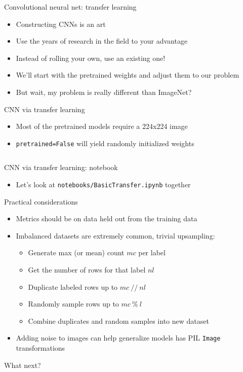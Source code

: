 \documentclass[hyperref={pdfpagelabels=false},12pt]{beamer}
\newcommand{\code}[2]{\texttt{#2}}
\newcommand{\python}[1]{\code{python}{#1}}
\newcommand{\unnamedUrl}[1]{\href{#1}{\color{blue}{#1}}}
\newcommand{\namedUrl}[2]{\href{#1}{\color{blue}{#2}}}
\newcommand{\pygment}[3]{\inputminted[bgcolor=lightgray,linenos,fontsize=#1]{#2}{#3}}
\begin{document}
\begin{frame}{Convolutional neural net: transfer learning}
  \begin{itemize}
    \item Constructing CNNs is an art
    \item Use the years of research in the field to your advantage
    \item Instead of rolling your own, use an existing one!
    \item We'll start with the pretrained weights and adjust them to our problem
    \item But wait, my problem is really different than ImageNet?
  \end{itemize}
\end{frame}

\begin{frame}{CNN via transfer learning}
  \begin{itemize}
    \item Most of the pretrained models require a 224x224 image
    \item \python{pretrained=False} will yield randomly initialized weights
  \end{itemize}
  \pygment{\scriptsize}{python}{code/transfer-model.py}
\end{frame}

\begin{frame}{CNN via transfer learning: notebook}
  \begin{itemize}
    \item Let's look at \texttt{notebooks/BasicTransfer.ipynb} together
  \end{itemize}
\end{frame}

\begin{frame}{Practical considerations}
  \begin{itemize}
    \item Metrics should be on data held out from the training data
    \item Imbalanced datasets are extremely common, trivial upsampling:
    \begin{itemize}
      \item Generate max (or mean) count $mc$ per label
      \item Get the number of rows for that label $nl$
      \item Duplicate labeled rows up to $mc\ //\ nl$
      \item Randomly sample rows up to $mc\ \%\ l$
      \item Combine duplicates and random samples into new dataset
    \end{itemize}
    \item Adding noise to images can help generalize models
      \namedUrl{https://pytorch.org/docs/stable/torchvision/transforms.html}{Torchvision
      transforms} has PIL \python{Image} transformations
  \end{itemize}
\end{frame}

\begin{frame}{What next?}
  \unnamedUrl{https://forms.gle/YWN8uXhiZLkbvXBM6}
\end{frame}
\end{document}
